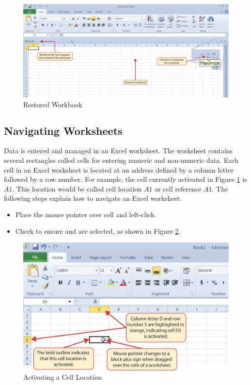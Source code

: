 \begin{figure}[H]
	\centering
	\includegraphics[width=\maxwidth{.95\linewidth}]{gfx/ch01_fig03}
	\caption{Restored Workbook}
	\label{01:fig03}
\end{figure}

\subsection{Navigating Worksheets}

Data is entered and managed in an Excel worksheet. The worksheet contains several rectangles called cells for entering numeric and non-numeric data. Each cell in an Excel worksheet is located at an address defined by a column letter followed by a row number. For example, the cell currently activated in Figure \ref{01:fig03} is $ A1 $. This location would be called cell location $ A1 $ or cell reference $ A1 $. The following steps explain how to navigate an Excel worksheet.

\begin{itemize}
	\item Place the mouse pointer over cell  and left-click.
	\item Check to ensure  and  are selected, as shown in Figure \ref{01:fig04}.
\end{itemize}

\begin{figure}[H]
	\centering
	\includegraphics[width=\maxwidth{.95\linewidth}]{gfx/ch01_fig04}
	\caption{Activating a Cell Location}
	\label{01:fig04}
\end{figure}

